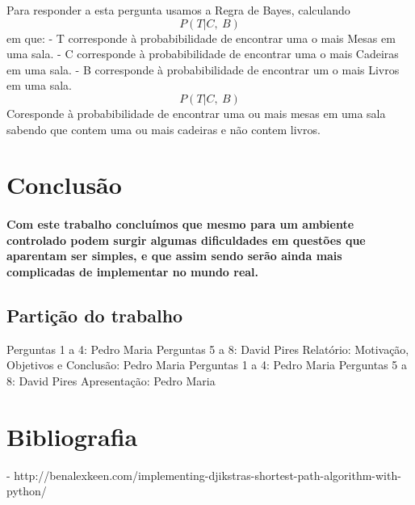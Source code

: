\documentclass{article}
\begin{document}
Para responder a esta pergunta usamos a Regra de Bayes, calculando \[P(T | C, ~B)\] em que:
\newline - T corresponde à probabibilidade de encontrar uma o mais Mesas em uma sala.
\newline - C corresponde à probabibilidade de encontrar uma o mais Cadeiras em uma sala.
\newline - B corresponde à probabibilidade de encontrar um o mais Livros em uma sala.
\newline \[P(T | C, ~B)\] Coresponde à probabibilidade de encontrar uma ou mais mesas em uma sala sabendo que contem uma ou mais cadeiras e não contem livros. 

\newpage
\section{Conclusão}

\paragraph{Com este trabalho concluímos que mesmo para um ambiente controlado podem surgir algumas dificuldades em questões que aparentam ser simples, e que assim sendo serão ainda mais complicadas de implementar no mundo real. }

\subsection{Partição do trabalho}

Perguntas 1 a 4: Pedro Maria
\newline Perguntas 5 a 8: David Pires
\newline Relatório:
\newline Motivação, Objetivos e Conclusão: Pedro Maria
\newline Perguntas 1 a 4: Pedro Maria
\newline Perguntas 5 a 8: David Pires
\newline Apresentação: Pedro Maria

\section{Bibliografia}

- http://benalexkeen.com/implementing-djikstras-shortest-path-algorithm-with-python/
\end{document}
